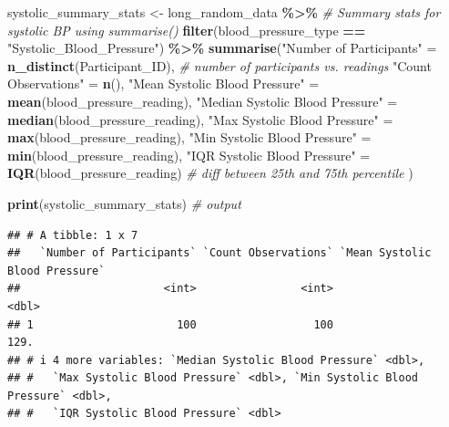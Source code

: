\documentclass[
]{article}
\newenvironment{Shaded}{\begin{snugshade}}{\end{snugshade}}
\newcommand{\CommentTok}[1]{\textcolor[rgb]{0.56,0.35,0.01}{\textit{#1}}}
\newcommand{\FunctionTok}[1]{\textcolor[rgb]{0.13,0.29,0.53}{\textbf{#1}}}
\newcommand{\NormalTok}[1]{#1}
\newcommand{\OtherTok}[1]{\textcolor[rgb]{0.56,0.35,0.01}{#1}}
\newcommand{\SpecialCharTok}[1]{\textcolor[rgb]{0.81,0.36,0.00}{\textbf{#1}}}
\newcommand{\StringTok}[1]{\textcolor[rgb]{0.31,0.60,0.02}{#1}}
\begin{document}
\begin{Shaded}
\begin{Highlighting}[]
\NormalTok{systolic\_summary\_stats }\OtherTok{\textless{}{-}}\NormalTok{ long\_random\_data }\SpecialCharTok{\%\textgreater{}\%} \CommentTok{\# Summary stats for systolic BP using summarise()}
  \FunctionTok{filter}\NormalTok{(blood\_pressure\_type }\SpecialCharTok{==} \StringTok{"Systolic\_Blood\_Pressure"}\NormalTok{) }\SpecialCharTok{\%\textgreater{}\%}
  \FunctionTok{summarise}\NormalTok{(}\StringTok{"Number of Participants"} \OtherTok{=} \FunctionTok{n\_distinct}\NormalTok{(Participant\_ID), }\CommentTok{\# number of participants vs. readings}
            \StringTok{"Count Observations"} \OtherTok{=} \FunctionTok{n}\NormalTok{(),}
            \StringTok{"Mean Systolic Blood Pressure"} \OtherTok{=} \FunctionTok{mean}\NormalTok{(blood\_pressure\_reading),}
            \StringTok{"Median Systolic Blood Pressure"} \OtherTok{=} \FunctionTok{median}\NormalTok{(blood\_pressure\_reading),}
            \StringTok{"Max Systolic Blood Pressure"} \OtherTok{=} \FunctionTok{max}\NormalTok{(blood\_pressure\_reading),}
            \StringTok{"Min Systolic Blood Pressure"} \OtherTok{=} \FunctionTok{min}\NormalTok{(blood\_pressure\_reading),}
            \StringTok{"IQR Systolic Blood Pressure"} \OtherTok{=} \FunctionTok{IQR}\NormalTok{(blood\_pressure\_reading) }\CommentTok{\# diff between 25th and 75th percentile}
\NormalTok{  )}

\FunctionTok{print}\NormalTok{(systolic\_summary\_stats) }\CommentTok{\# output}
\end{Highlighting}
\end{Shaded}

\begin{verbatim}
## # A tibble: 1 x 7
##   `Number of Participants` `Count Observations` `Mean Systolic Blood Pressure`
##                      <int>                <int>                          <dbl>
## 1                      100                  100                           129.
## # i 4 more variables: `Median Systolic Blood Pressure` <dbl>,
## #   `Max Systolic Blood Pressure` <dbl>, `Min Systolic Blood Pressure` <dbl>,
## #   `IQR Systolic Blood Pressure` <dbl>
\end{verbatim}
\end{document}
